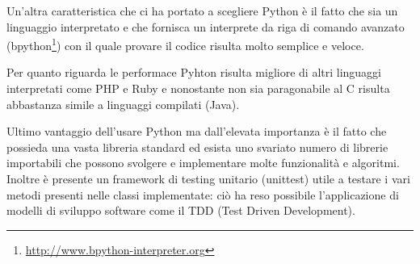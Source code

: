 \documentclass[12pt]{report}
\begin{document}
\begin{itemize}


\vspace{5mm} %
\end{itemize}  
 
Un'altra caratteristica che ci ha portato a scegliere Python è il fatto che sia un linguaggio interpretato e che fornisca un interprete da riga di comando avanzato (bpython\footnote{\url{http://www.bpython-interpreter.org}}) con il quale provare il codice risulta molto semplice e veloce. 

Per quanto riguarda le performace Pyhton risulta migliore di altri linguaggi interpretati come PHP e Ruby e nonostante non sia paragonabile al C risulta abbastanza simile a linguaggi compilati (Java). %

Ultimo vantaggio dell'usare Python ma dall'elevata importanza è il fatto che possieda una vasta libreria standard ed esista uno svariato numero di librerie importabili che possono svolgere e implementare molte funzionalità e algoritmi. Inoltre è presente un framework di testing unitario (unittest) utile a testare i vari metodi presenti nelle classi implementate: ciò ha reso possibile l'applicazione di modelli di sviluppo software come il TDD (Test Driven Development). %
\end{document}
